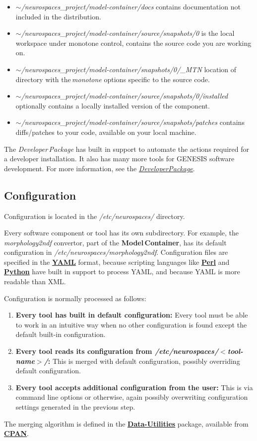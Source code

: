 \documentclass[12pt]{article}
\begin{document}
\begin{itemize}
\item[]{\it $\sim$/neurospaces\_project/model-container/docs} contains documentation not included in the distribution. 
\item[]{\it $\sim$/neurospaces\_project/model-container/source/snapshots/0} is the local workspace under monotone control, contains the source code you are working on. 
\item[]{\it $\sim$/neurospaces\_project/model-container/snapshots/0/\_MTN} location of directory with the\,{\it monotone} options specific to the source code.
\item[]{\it $\sim$/neurospaces\_project/model-container/source/snapshots/0/installed} optionally contains a locally installed version of the component.
\item[]{\it $\sim$/neurospaces\_project/model-container/source/snapshots/patches} contains diffs/patches to your code, available on your local machine.
\end{itemize}
The {\it Developer\,Package} has built in support to automate the actions required for a developer installation. It also has many more tools for GENESIS software development. For more information, see the \href{../developer-package/developer-package.tex}{\it DeveloperPackage}.

\subsection*{Configuration}

Configuration is located in the {\it /etc/neurospaces/} directory.

Every software component or tool has its own subdirectory. For example, the {\it morphology2ndf} convertor, part of the {\bf Model\,Container}, has its default configuration in {\it /etc/neurospaces/morphology2ndf}. Configuration files are specified in the \href{http://www.yaml.org/}{\bf YAML} format, because scripting languages like \href{http://www.perl.org/}{\bf Perl} and \href{http://www.python.org/}{\bf Python} have built in support to process YAML, and because YAML is more readable than XML.

Configuration is normally processed as follows:
\begin{enumerate}
\item {\bf Every tool has built in default configuration:} Every tool must be able to work in an intuitive way when no other configuration is found except the default built-in configuration.
\item {\bf Every tool reads its configuration from {\it /etc/neurospaces/$<$tool-name$>$/}:} This is merged with default configuration, possibly overriding default configuration.
\item {\bf Every tool accepts additional configuration from the user:} This is via command line options or otherwise, again possibly overwriting configuration settings generated in the previous step. 
\end{enumerate}
The merging algorithm is defined in the \href{http://search.cpan.org/dist/Data-Utilities/}{\bf Data-Utilities} package, available from \href{http://www.cpan.org/}{\bf CPAN}.
\end{document}
